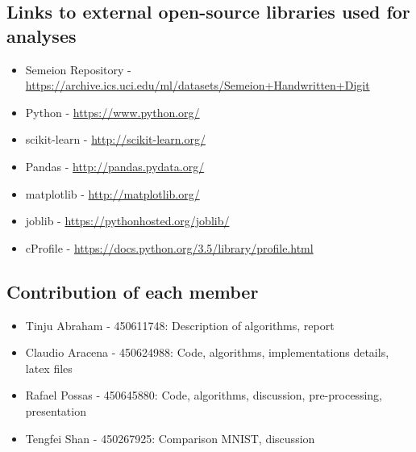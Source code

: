 \documentclass[letterpaper,10pt]{article}
\theoremstyle{mytheor}
\begin{document}
\subsection{Links to external open-source libraries used for analyses}
\begin{itemize}
\item Semeion Repository - \url{https://archive.ics.uci.edu/ml/datasets/Semeion+Handwritten+Digit}
\item Python - \url{https://www.python.org/}
\item scikit-learn - \url{http://scikit-learn.org/}
\item Pandas - \url{http://pandas.pydata.org/}
\item matplotlib - \url{http://matplotlib.org/}
\item joblib - \url{https://pythonhosted.org/joblib/}
\item cProfile - \url{https://docs.python.org/3.5/library/profile.html}
\end{itemize}

\subsection{Contribution of each member}
\begin{itemize}
\item Tinju Abraham - 450611748: Description of algorithms, report	
\item Claudio Aracena - 450624988: Code, algorithms, implementations details, latex files
\item Rafael Possas - 450645880: Code, algorithms, discussion, pre-processing, presentation
\item Tengfei Shan - 450267925: Comparison MNIST, discussion
\end{itemize}
\end{document}
